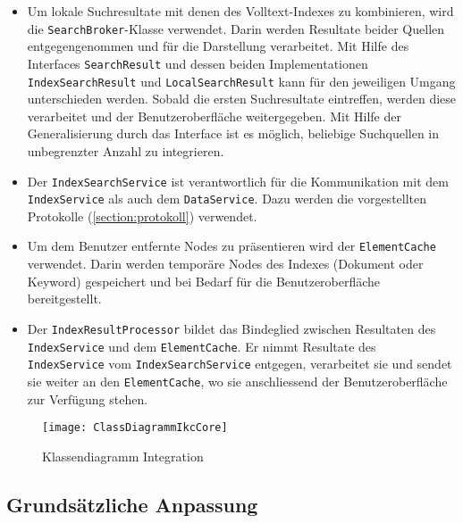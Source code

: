 \begin{itemize}
    \item Um lokale Suchresultate mit denen des Volltext-Indexes zu kombinieren, wird die \texttt{SearchBroker}-Klasse verwendet. Darin werden Resultate beider Quellen entgegengenommen und für die Darstellung verarbeitet. Mit Hilfe des Interfaces \texttt{SearchResult} und dessen beiden Implementationen \texttt{IndexSearchResult} und \texttt{LocalSearchResult} kann für den jeweiligen Umgang unterschieden werden. Sobald die ersten Suchresultate eintreffen, werden diese verarbeitet und der Benutzeroberfläche weitergegeben. Mit Hilfe der Generalisierung durch das Interface ist es möglich, beliebige Suchquellen in unbegrenzter Anzahl zu integrieren.\\ 
    \item Der \texttt{IndexSearchService} ist verantwortlich für die Kommunikation mit dem \texttt{IndexService} als auch dem \texttt{DataService}. Dazu werden die vorgestellten Protokolle (\autoref{section:protokoll}) verwendet.\\
    \item Um dem Benutzer entfernte Nodes zu präsentieren wird der \texttt{ElementCache} verwendet. Darin werden temporäre Nodes des Indexes (Dokument oder \gls{Keyword}) gespeichert und bei Bedarf für die Benutzeroberfläche bereitgestellt.
    \item Der \texttt{IndexResultProcessor} bildet das Bindeglied zwischen Resultaten des \texttt{IndexService} und dem \texttt{ElementCache}. Er nimmt Resultate des \texttt{IndexService} vom \texttt{IndexSearchService} entgegen, verarbeitet sie und sendet sie weiter an den \texttt{ElementCache}, wo sie anschliessend der Benutzeroberfläche zur Verfügung stehen.\\

\end{itemize}


    \begin{figure}[H]
    \centering
    \texttt{[image: ClassDiagrammIkcCore]}
    \caption{Klassendiagramm Integration}
    \label{fig:classDiagrammIkcCore}
    \end{figure}



\subsection{Grundsätzliche Anpassung}

